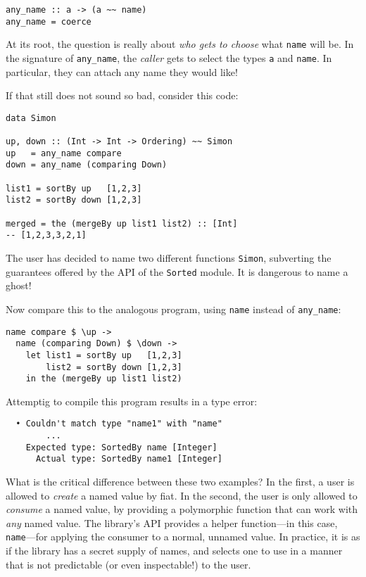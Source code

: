 \documentclass[format=sigplan, review=false, screen=true]{acmart}
\begin{document}
\begin{verbatim}
any_name :: a -> (a ~~ name)
any_name = coerce
\end{verbatim}

At its root, the question is really about \emph{who gets to choose} what \texttt{name} will be.
In the signature of \texttt{any\_name}, the \emph{caller} gets to select the types \texttt{a}
and \texttt{name}. In particular, they can attach any name they would like!

If that still does not sound so bad, consider this code:

\begin{verbatim}
data Simon
  
up, down :: (Int -> Int -> Ordering) ~~ Simon
up   = any_name compare
down = any_name (comparing Down)

list1 = sortBy up   [1,2,3]
list2 = sortBy down [1,2,3]

merged = the (mergeBy up list1 list2) :: [Int]
-- [1,2,3,3,2,1]
\end{verbatim}
\noindent
The user has decided to name two different functions \texttt{Simon}, subverting the
guarantees offered by the API of the \texttt{Sorted} module. It is dangerous to
name a ghost!

Now compare this to the analogous program, using \texttt{name} instead of \texttt{any\_name}:
\begin{verbatim}
name compare $ \up ->
  name (comparing Down) $ \down ->
    let list1 = sortBy up   [1,2,3]
        list2 = sortBy down [1,2,3]
    in the (mergeBy up list1 list2)
\end{verbatim}
\noindent
Attemptig to compile this program results in a type error:

\begin{lstlisting}
  • Couldn't match type "name1" with "name"
        ...
    Expected type: SortedBy name [Integer]
      Actual type: SortedBy name1 [Integer]
\end{lstlisting}
\noindent
What is the critical difference between these two examples? In the first, a user is
allowed to \emph{create} a named value by fiat. In the second, the user is only allowed to \emph{consume} a named value, by
providing a polymorphic function that can work with \emph{any} named value. The library's API provides
a helper function---in this case, \texttt{name}---for applying the consumer to a normal, unnamed value.
In practice, it is as if the
library has a secret supply of names, and selects one to use in a manner that is not
predictable (or even inspectable!) to the user.
\end{document}

